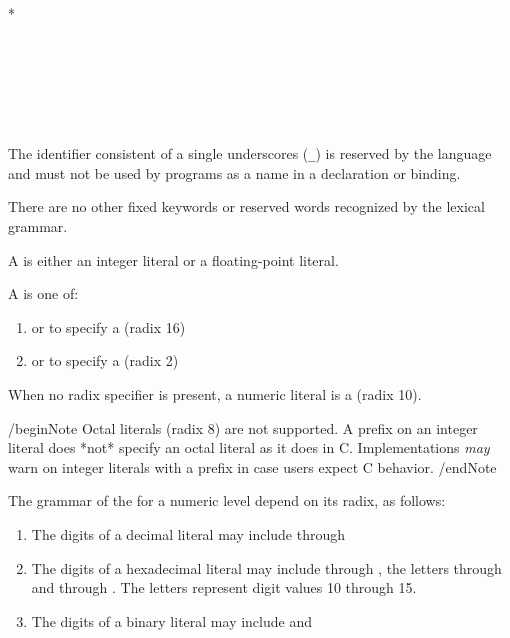 \begin{Lexical}
     \\
         \\
        \SynOr {}*

     \\
         \\
        \SynOr {} \\
        \SynOr \SynRef{\lstinline{\_}}

     \\
        \SynOr {}        
\end{Lexical}

The identifier consistent of a single underscores (\lstinline{_}) is reserved by the language and must not be used by programs as a name in a declaration or binding.

\begin{Note}
There are no other fixed keywords or reserved words recognized by the lexical grammar.
\end{Note}



A  is either an integer literal or a floating-point literal.

A  is one of:

\begin{enumerate}
    \item{ or  to specify a  (radix 16)}
    \item{ or  to specify a  (radix 2)}
\end{enumerate}
When no radix specifier is present, a numeric literal is a  (radix 10).

/begin{Note}
Octal literals (radix 8) are not supported.
A  prefix on an integer literal does *not* specify an octal literal as it does in C.
Implementations \emph{may} warn on integer literals with a  prefix in case users expect C behavior.
/end{Note}

The grammar of the  for a numeric level depend on its radix, as follows:

\begin{enumerate}
    \item{The digits of a decimal literal may include  through }
    \item{The digits of a hexadecimal literal may include  through , the letters  through  and  through . The letters represent digit values 10 through 15.}
    \item{The digits of a binary literal may include  and }
\end{enumerate}

